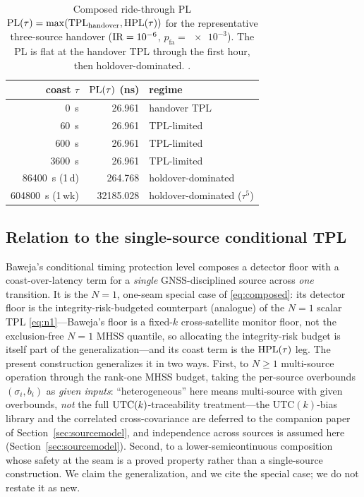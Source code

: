 \begin{table}[t]
  \centering
  \caption{Composed ride-through PL $\mathrm{PL}(\tau)=\max(\mathrm{TPL}_{\mathrm{handover}},
  \mathrm{HPL}(\tau))$ for the representative three-source handover
  ($\mathrm{IR}=\num{e-6}$, $p_{\mathrm{fa}}=\num{e-3}$). The PL is flat at the handover
  TPL through the first hour, then holdover-dominated. \Modelled{}.}
  \label{tab:ridethrough}
  \begin{tabular}{r r l}
    \toprule
    coast $\tau$ & $\mathrm{PL}(\tau)$ (ns) & regime \\
    \midrule
    \SI{0}{\second}        & 26.961      & handover TPL \\
    \SI{60}{\second}       & 26.961      & TPL-limited \\
    \SI{600}{\second}      & 26.961      & TPL-limited \\
    \SI{3600}{\second}     & 26.961      & TPL-limited \\
    \SI{86400}{\second} (1\,d)  & 264.768     & holdover-dominated \\
    \SI{604800}{\second} (1\,wk) & 32185.028   & holdover-dominated ($\tau^{5}$) \\
    \bottomrule
  \end{tabular}
\end{table}

\subsection{Relation to the single-source conditional TPL}
\label{sec:baweja}

Baweja's conditional timing protection level \citep{baweja2026tpl} composes a
detector floor with a coast-over-latency term for a \emph{single}
GNSS-disciplined source across \emph{one} transition. It is the $N=1$, one-seam
special case of \eqref{eq:composed}: its detector floor is the integrity-risk-budgeted
counterpart (analogue) of the $N=1$ scalar TPL \eqref{eq:n1}---Baweja's floor is a
fixed-$k$ cross-satellite monitor floor, not the exclusion-free $N=1$ MHSS quantile,
so allocating the integrity-risk budget is itself part of the generalization---and
its coast term is the $\mathrm{HPL}(\tau)$ leg. The present construction generalizes it in
two ways. First, to $N\ge1$ multi-source operation through the rank-one MHSS budget,
taking the per-source overbounds $(\sigma_i,b_i)$ as \emph{given inputs}:
``heterogeneous'' here means multi-source with given overbounds, \emph{not} the full
$\mathrm{UTC}(k){}$-traceability treatment---the UTC$(k)$-bias library and the correlated
cross-covariance are deferred to the companion paper of
Section~\ref{sec:sourcemodel}, and independence across sources is assumed here
(Section~\ref{sec:sourcemodel}). Second, to a lower-semicontinuous composition whose
safety at the seam is a proved property rather than a single-source construction. We
claim the generalization, and we cite the special case; we do not restate it as new.
